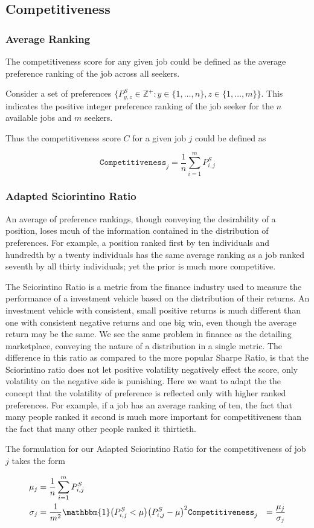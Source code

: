 \subsection{Competitiveness}

\subsubsection{Average Ranking}

The competitiveness score for any given job could be defined as the average preference ranking of the job across all seekers.

Consider a set of preferences $\{P^{S}_{y,z} \in \mathbb{Z}^+: y \in \{1, \dots, n\}, z \in \{1, \dots, m\}\}$. This indicates the positive integer preference ranking of the job seeker for the $n$ available jobs and $m$ seekers. 

Thus the competitiveness score $C$ for a given job $j$ could be defined as 

\[\texttt{Competitiveness}_j = \frac{1}{n} \sum_{i=1}^m P^S_{i,j}\]

\subsubsection{Adapted Sciorintino Ratio}

An average of preference rankings, though conveying the desirability of a position, loses mcuh of the information contained in the distribution of preferences. For example, a position ranked first by ten individuals and hundredth by a twenty individuals has the same average ranking as a job ranked seventh by all thirty individuals; yet the prior is much more competitive. 

The Sciorintino Ratio is a metric from the finance industry used to measure the performance of a investment vehicle based on the distribution of their returns. An investment vehicle with consistent, small positive returns is much different than one with consistent negative returns and one big win, even though the average return may be the same. We see the same problem in finance as the detailing marketplace, conveying the nature of a distribution in a single metric. The difference in this ratio as compared to the more popular Sharpe Ratio, is that the Sciorintino ratio does not let positive volatility negatively effect the score, only volatility on the negative side is punishing. Here we want to adapt the the concept that the volatility of preference is reflected only with higher ranked preferences. For example, if a job has an average ranking of ten, the fact that many people ranked it second is much more important for competitiveness than the fact that many other people ranked it thirtieth.

The formulation for our Adapted Sciorintino Ratio for the competitiveness of job $j$ takes the form

\begin{align}
\mu_j &= \frac{1}{n} \sum_{i=1}^m P^S_{i,j} \\
\sigma_j &= \frac{1}{m^2} \mathbbm{1}\big( P^S_{i,j} < \mu \big) \big(P^S_{i,j} - \mu \big)^2
\texttt{Competitiveness}_j &= \frac{\mu_j}{\sigma_j}
\end{align}